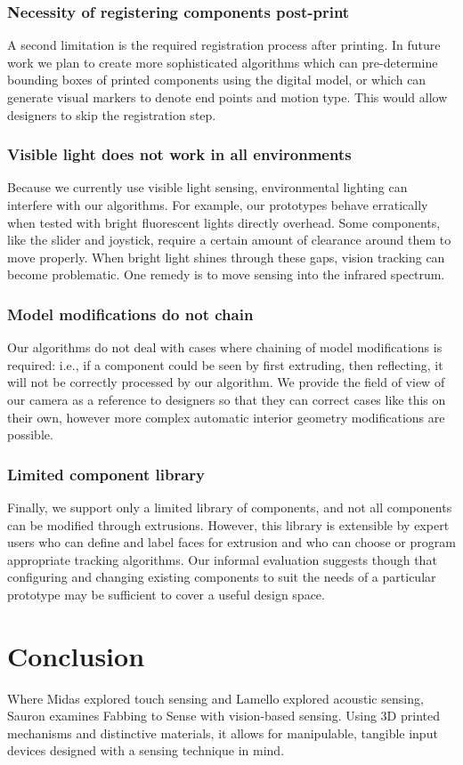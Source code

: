     \subsubsection{Necessity of registering components post-print}
    A second limitation is the required registration process after printing. In future work we plan to create more sophisticated algorithms which can pre-determine bounding boxes of printed components using the digital model, or which can generate visual markers to denote end points and motion type. This would allow designers to skip the registration step.
    
    \subsubsection{Visible light does not work in all environments}
    Because we currently use visible light sensing, environmental lighting can interfere with our algorithms. For example, our prototypes behave erratically when tested with bright fluorescent lights directly overhead. Some components, like the slider and joystick, require a certain amount of clearance around them to move properly. When bright light shines through these gaps, vision tracking can become problematic. One remedy is to move sensing into the infrared spectrum.%
    
    \subsubsection{Model modifications do not chain}
    Our algorithms do not deal with cases where chaining of model modifications is required: i.e., if a component could be seen by first extruding, then reflecting, it will not be correctly processed by our algorithm. We provide the field of view of our camera as a reference to designers so that they can correct cases like this on their own, however more complex automatic interior geometry modifications are possible. 
    
    \subsubsection{Limited component library}
    Finally, we support only a limited library of components, and not all components can be modified through extrusions. However, this library is extensible by expert users who can define and label faces for extrusion and who can choose or program appropriate tracking algorithms. Our informal evaluation suggests though that configuring and changing existing components to suit the needs of a particular prototype may be sufficient to cover a useful design space.

\section{Conclusion}

Where Midas explored touch sensing and Lamello explored acoustic sensing, Sauron examines Fabbing to Sense with vision-based sensing. Using 3D printed mechanisms and distinctive materials, it allows for manipulable, tangible input devices designed with a sensing technique in mind.